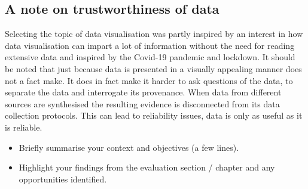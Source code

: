 \subsection{A note on trustworthiness of data}
Selecting the topic of data visualisation was partly inspired by an interest in how data visualisation can impart a lot of information without the need for reading extensive data and inspired by the Covid-19 pandemic and lockdown. It should be noted that just because data is presented in a visually appealing manner does not a fact make. It does in fact make it harder to ask questions of the data, to separate the data and interrogate its provenance. When data from different sources are synthesised the resulting evidence is disconnected from its data collection protocols. This can lead to reliability issues, data is only as useful as it is reliable. 









\begin{itemize}
\item Briefly summarise your context and objectives (a few lines).
\item Highlight your findings from the evaluation section / chapter and any opportunities identified.
\end{itemize}

